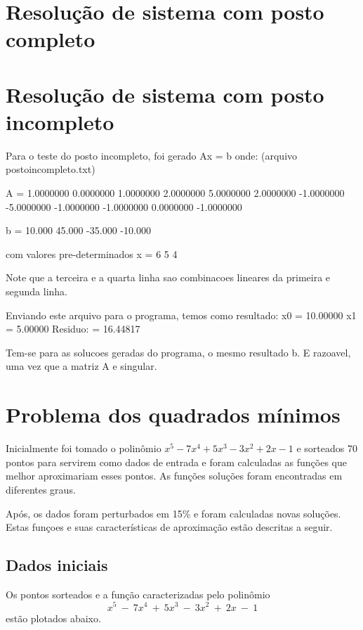 \chapter{Resolução de sistema com posto completo}


\chapter{Resolução de sistema com posto incompleto}
Para o teste do posto incompleto, foi gerado Ax = b onde:
(arquivo postoincompleto.txt)

A =         1.0000000   0.0000000   1.0000000  
            2.0000000   5.0000000   2.0000000  
      	   -1.0000000  -5.0000000  -1.0000000  
       	   -1.0000000   0.0000000  -1.0000000 

b =    10.000  
  	   45.000  
	  -35.000  
	  -10.000  

com valores pre-determinados x = 6
    	    		         5
			         4

Note que a terceira e a quarta linha sao combinacoes lineares da primeira e segunda linha.

Enviando este arquivo para o programa, temos como resultado:
x0 = 10.00000 
x1 = 5.00000 
Residuo: = 16.44817 

Tem-se para as solucoes geradas do programa, o mesmo resultado b. E razoavel, 
uma vez que a matriz A e singular. 


\chapter{Problema dos quadrados mínimos}
Inicialmente foi tomado o polinômio $x^5-7x^4+5x^3-3x^2+2x-1$ e sorteados
70 pontos para servirem como  dados de entrada e foram calculadas as funções que
melhor aproximariam esses pontos.
As funções soluções foram encontradas em diferentes graus. 

Após, os dados foram perturbados em 15\% e foram calculadas novas
soluções. Estas funçoes e suas características de aproximação estão descritas 
a seguir.

\section{Dados iniciais}
Os pontos sorteados e a função caracterizadas pelo polinômio \[x^5~-~7x^4~+~5x^3~-~3x^2~+~2x~-~1\]
estão plotados abaixo.

